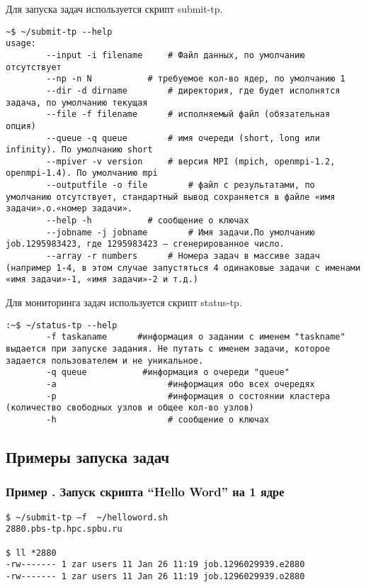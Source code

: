 \documentclass[a4paper,8pt]{extreport}
\newcounter{ex}
\begin{document}
Для запуска задач используется скрипт submit-tp.
\begin{lstlisting}
~$ ~/submit-tp --help
usage:  
        --input -i filename		# Файл данных, по умолчанию отсутствует
        --np -n N			# требуемое кол-во ядер, по умолчанию 1
        --dir -d dirname		# директория, где будет исполнятся задача, по умолчанию текущая
        --file -f filename		# исполняемый файл (обязательная опция)
        --queue -q queue		# имя очереди (short, long или infinity). По умолчанию short
        --mpiver -v version		# версия MPI (mpich, openmpi-1.2, openmpi-1.4). По умолчанию mpi
        --outputfile -o file		# файл с результатами, по умолчанию отсутствует, стандартный вывод сохраняется в файле «имя задачи».o.«номер задачи». 
        --help -h			# сообщение о ключах
        --jobname -j jobname		# Имя задачи.По умолчанию  job.1295983423, где 1295983423 – сгенерированное число.
        --array -r numbers		# Номера задач в массиве задач (например 1-4, в этом случае запустяться 4 одинаковые задачи с именами «имя задачи»-1, «имя задачи»-2 и т.д.)
\end{lstlisting}

Для мониторинга задач используется скрипт status-tp.
\begin{lstlisting}
:~$ ~/status-tp --help
        -f taskaname      #информация о задании с именем "taskname" выдается при запуске задания. Не путать с именем задачи, которое задается пользователем и не уникальное.
        -q queue           #информация о очереди "queue"
        -a                      #информация обо всех очередях
        -p                      #информация о состоянии кластера (количество свободных узлов и общее кол-во узлов)
        -h                      # сообщение о ключах
\end{lstlisting}

\subsection{Примеры запуска задач}
\subsubsection{Пример . Запуск скрипта “Hello Word” на 1 ядре}
\begin{lstlisting}
$ ~/submit-tp –f  ~/helloword.sh
2880.pbs-tp.hpc.spbu.ru

$ ll *2880
-rw------- 1 zar users 11 Jan 26 11:19 job.1296029939.e2880
-rw------- 1 zar users 11 Jan 26 11:19 job.1296029939.o2880
\end{lstlisting}
\end{document}

